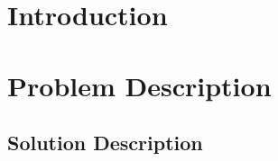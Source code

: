 \documentclass[mnsc,nonblindrev]{informs3} %
\begin{document}
%


\section{Introduction}



\section{Problem Description}



\subsection{Solution Description}
\end{document}
